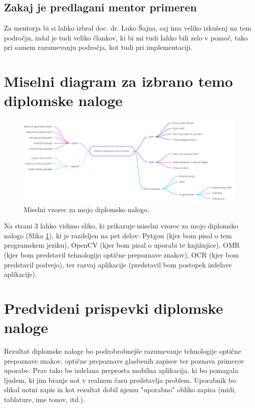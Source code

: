 \documentclass[11pt,a4paper]{article}
\begin{document}
\subsection{Zakaj je predlagani mentor primeren}

Za mentorja bi si lahko izbral doc. dr. Luko Šajna, saj ima veliko izkušenj na tem področju, izdal je tudi veliko člankov, ki bi mi tudi lahko bili zelo v pomoč, tako pri samem razumevanju področja, kot tudi pri implementaciji.


\section{Miselni diagram za izbrano temo diplomske naloge}

\begin{figure}[p]
\centerline{\includegraphics[scale=0.45, angle=90]{mindmap.png}}
\caption{Miselni vzorec za mojo diplomsko nalogo.}
\label{sl:mindmap}
\end{figure}

Na strani 3 lahko vidimo sliko, ki prikazuje miselni vzorec za mojo diplomsko nalogo (Slika \ref{sl:mindmap}), ki je razdeljen na pet delov: Pytgon (kjer bom pisal o tem programskem jeziku), OpenCV (kjer bom pisal o uporabi te knjižnjice), OMR (kjer bom predstavil tehnologijo optične prepoznave znakov), OCR (kjer bom predstavil podvejo), ter razvoj aplikacije (predstavil bom postopek izdelave aplikacije).



\section{Predvideni prispevki diplomske naloge}

Rezultat diplomske naloge bo podrobrobnejše razumevanje tehnologije optične prepoznave znakov, optične prepoznave glasbenih zapisov ter poznava primerov uporabe. Prav tako bo izdelana preprosta mobilna aplikacija, ki bo pomagala ljudem, ki jim branje not v realnem času predstavlja problem. Uporabnik bo slikal notni zapis in kot rezultat dobil njemu "uporabno" obliko zapisa (midi, tablature, ime tonov, itd.).
\end{document}
